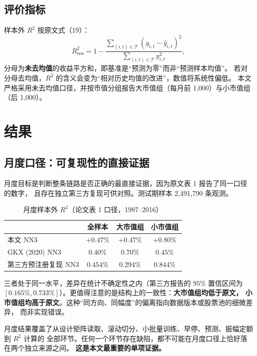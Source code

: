\documentclass[11pt,a4paper,fontset=windows]{ctexart}
\newcommand{\R}{R^2_{\mathrm{oos}}}
\begin{document}
\subsection{评价指标}

样本外 $R^2$ 按原文式（19）：
\begin{equation}
\R = 1 - \frac{\sum_{(i,t)\in\mathcal{T}}\left(y_{i,t} - \hat y_{i,t}\right)^2}
{\sum_{(i,t)\in\mathcal{T}} y_{i,t}^2},
\end{equation}
分母为\textbf{未去均值}的收益平方和，即基准是``预测为零''而非``预测样本均值''。
若对分母去均值，$R^2$ 的含义会变为``相对历史均值的改进''，数值将系统性偏低。
本文严格采用未去均值口径，并按市值分组报告大市值组（每月前 1{,}000）与小市值组（后 1{,}000）。

\section{结果}\label{sec:results}

\subsection{月度口径：可复现性的直接证据}

月度目标是判断整条链路是否正确的最直接证据，因为原文表 1 报告了同一口径的数字，
且存在独立第三方复现可供对照。测试期样本 2{,}491{,}790 条观测。

\begin{table}[htbp]
\centering
\caption{月度样本外 $R^2$（论文表 1 口径，1987--2016）}
\label{tab:monthly}
\small
\begin{tabular}{lccc}
\toprule
 & 全样本 & 大市值组 & 小市值组 \\
\midrule
本文 NN3 & $+0.47\%$ & $+0.47\%$ & $+0.80\%$ \\
GKX (2020) NN3 & $0.40\%$ & $0.70\%$ & $0.45\%$ \\
第三方预注册复现 NN3 & $0.454\%$ & $0.294\%$ & $0.844\%$ \\
\bottomrule
\end{tabular}
\end{table}

三者处于同一水平，差异在统计不确定性之内（第三方报告的 $95\%$ 置信区间为
$[0.165\%, 0.733\%]$）。更值得注意的是结构上的一致性：\textbf{大市值组均低于原文，
小市值组均高于原文}。这种``同方向、同幅度''的偏离指向数据版本或股票池的细微差异，
而非实现错误。

月度结果覆盖了从设计矩阵读取、滚动切分、小批量训练、早停、预测、振幅定额到 $R^2$ 计算的
全部环节。任何一个环节存在缺陷，都不可能在月度口径上恰好落在两个独立来源之间。
\textbf{这是本文最重要的单项证据。}
\end{document}
